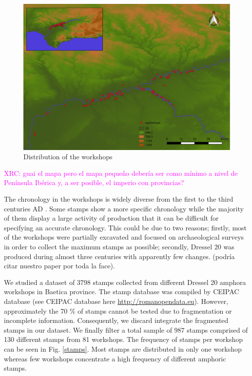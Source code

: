 \documentclass[review]{elsarticle}
\newcommand{\memo}[2]{\textcolor{#1}{#2}}
\newcommand{\xavi}[1]{\memo{magenta}{XRC: #1\\}}
\begin{document}
\begin{figure}[htp]
	\centering
\includegraphics[width=\linewidth]{figs/workshop}
\caption{Distribution of the workshops}
\label{workshop}
\end{figure} 

\xavi{guai el mapa pero el mapa pequeño debería ser como mínimo a nivel de Península Ibérica y, a ser posible, el imperio con provincias?}

The chronology in the workshops is widely diverse from the first to the third centuries AD \citep{millet_anforas_1998,rodriguez_baetican_1998,chic2005comercio}. Some stamps show a more specific chronology while the majority of them display a large activity of production that it can be difficult for specifying an accurate chronology. This could be due to two reasons; firstly, most of the workshops were partially excavated and focused on archaeological surveys in order to collect the maximum stamps as possible; secondly, Dressel 20 was produced during almost three centuries with apparently few changes. (podría citar nuestro paper por toda la face).
 
We studied a dataset of 3798 stamps collected from different Dressel 20 amphora workshops in Baetica province. The stamp database was compiled by CEIPAC database \citep{remesal_centro_2015} (see CEIPAC database here \url{http://romanopendata.eu}). However, approximately the 70 \% of stamps cannot be tested due to fragmentation or incomplete information. Consequently, we discard integrate the fragmented stamps in our dataset. We finally filter a total sample of 987 stamps comprised of 130 different stamps from 81 workshops. The frequency of stamps per workshop can be seen in Fig. \ref{stamps}. Most stamps are distributed in only one workshop whereas few workshops concentrate a high frequency of different amphoric stamps. 
\end{document}
